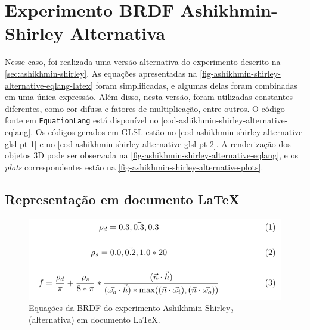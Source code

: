 
\section{Experimento BRDF Ashikhmin-Shirley Alternativa}
\label{section-experiment-ashikhmin-shirley-alternative}

Nesse caso, foi realizada uma versão alternativa do experimento descrito na \autoref{sec:ashikhmin-shirley}. As equações apresentadas na \autoref{fig-ashikhmin-shirley-alternative-eqlang-latex} foram simplificadas, e algumas delas foram combinadas em uma única expressão. Além disso, nesta versão, foram utilizadas constantes diferentes, como cor difusa e fatores de multiplicação, entre outros. O código-fonte em \texttt{EquationLang} está disponível no \autoref{cod-ashikhmin-shirley-alternative-eqlang}. Os códigos gerados em GLSL estão no \autoref{cod-ashikhmin-shirley-alternative-glsl-pt-1} e no \autoref{cod-ashikhmin-shirley-alternative-glsl-pt-2}. A renderização dos objetos 3D pode ser observada na \autoref{fig-ashikhmin-shirley-alternative-eqlang}, e os \textit{plots} correspondentes estão na \autoref{fig-ashikhmin-shirley-alternative-plots}.
\subsection{Representação em documento \LaTeX{}}
\begin{figure}[H]
  \caption{\label{fig-ashikhmin-shirley-alternative-eqlang-latex}
  \small Equações da BRDF do experimento Ashikhmin-Shirley$_2$ (alternativa) em documento \LaTeX{}.}
    \begin{center}
        \includegraphics[scale=0.92]{./Imagens/brdfs/ashikhmin-shirley-alternative.pdf}
    \end{center}
\end{figure}

